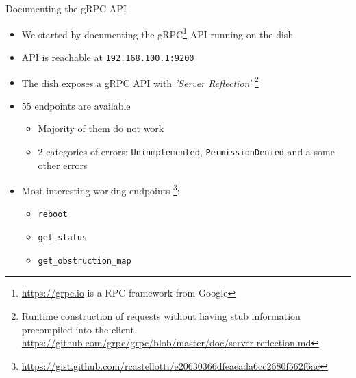 \documentclass[NET,english,beameralt]{tumbeamer}
\begin{document}
\begin{frame}{Documenting the gRPC API}
    \begin{itemize}
        \item We started by documenting the gRPC\footnote{\url{https://grpc.io} is a RPC framework from Google} API
              running on the dish
        \item API is reachable at \texttt{192.168.100.1:9200}
        \item The dish exposes a gRPC API with \emph{'Server Reflection'} \footnote{Runtime construction of requests
              without having stub information precompiled into the client.
              \url{https://github.com/grpc/grpc/blob/master/doc/server-reflection.md}}
        \item 55 endpoints are available
            \begin{itemize}
                \item Majority of them do not work
                \item 2 categories of errors: \texttt{Uninmplemented}, \texttt{PermissionDenied} and a some other errors 
            \end{itemize}
        \item Most interesting working endpoints \footnote{\url{https://gist.github.com/rcastellotti/e20630366dfeaeada6cc2680f562f6ac}}: 
            \begin{itemize}
                \item \texttt{reboot}
                \item \texttt{get\_status}
                \item \texttt{get\_obstruction\_map}
            \end{itemize}
    \end{itemize}
\end{frame}
\end{document}
